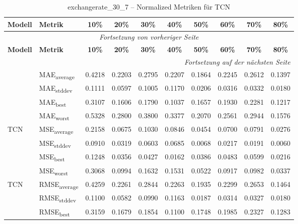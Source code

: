 {\small
\begin{longtable}{l l c c c c c c c c}
    \toprule
    \textbf{Modell} & \textbf{Metrik} & \textbf{10\%} & \textbf{20\%} & \textbf{30\%} & \textbf{40\%} & \textbf{50\%} & \textbf{60\%} & \textbf{70\%} & \textbf{80\%} \\
    \midrule
    \endfirsthead
    \multicolumn{10}{c}{\textit{Fortsetzung von vorheriger Seite}} \\
    \toprule
    \textbf{Modell} & \textbf{Metrik} & \textbf{10\%} & \textbf{20\%} & \textbf{30\%} & \textbf{40\%} & \textbf{50\%} & \textbf{60\%} & \textbf{70\%} & \textbf{80\%} \\
    \midrule
    \endhead
    \midrule
    \multicolumn{10}{r}{\textit{Fortsetzung auf der nächsten Seite}} \\
    \midrule
    \endfoot
    \bottomrule
    \caption{exchangerate_30_7 -- Normalized Metriken für TCN}
    \label{tab:exchangerate_30_7_normalized_tcn}
    \endlastfoot
\multirow{4}{*}{TCN} & MAE\textsubscript{average} & 0.4218 & 0.2203 & 0.2795 & 0.2207 & 0.1864 & 0.2245 & 0.2612 & 0.1397 \\
 & MAE\textsubscript{stddev} & 0.1111 & 0.0597 & 0.1005 & 0.1170 & 0.0206 & 0.0316 & 0.0332 & 0.0180 \\
 & MAE\textsubscript{best} & 0.3107 & 0.1606 & 0.1790 & 0.1037 & 0.1657 & 0.1930 & 0.2281 & 0.1217 \\
 & MAE\textsubscript{worst} & 0.5328 & 0.2800 & 0.3800 & 0.3377 & 0.2070 & 0.2561 & 0.2944 & 0.1576 \\
\cmidrule(lr){2-10}
\multirow{4}{*}{TCN} & MSE\textsubscript{average} & 0.2158 & 0.0675 & 0.1030 & 0.0846 & 0.0454 & 0.0700 & 0.0791 & 0.0276 \\
 & MSE\textsubscript{stddev} & 0.0910 & 0.0319 & 0.0603 & 0.0685 & 0.0068 & 0.0217 & 0.0191 & 0.0060 \\
 & MSE\textsubscript{best} & 0.1248 & 0.0356 & 0.0427 & 0.0162 & 0.0386 & 0.0483 & 0.0599 & 0.0216 \\
 & MSE\textsubscript{worst} & 0.3068 & 0.0994 & 0.1632 & 0.1531 & 0.0522 & 0.0917 & 0.0982 & 0.0337 \\
\cmidrule(lr){2-10}
\multirow{4}{*}{TCN} & RMSE\textsubscript{average} & 0.4259 & 0.2261 & 0.2844 & 0.2263 & 0.1935 & 0.2299 & 0.2653 & 0.1464 \\
 & RMSE\textsubscript{stddev} & 0.1100 & 0.0582 & 0.0990 & 0.1163 & 0.0187 & 0.0314 & 0.0327 & 0.0180 \\
 & RMSE\textsubscript{best} & 0.3159 & 0.1679 & 0.1854 & 0.1100 & 0.1748 & 0.1985 & 0.2327 & 0.1283 \\

\end{longtable}}
